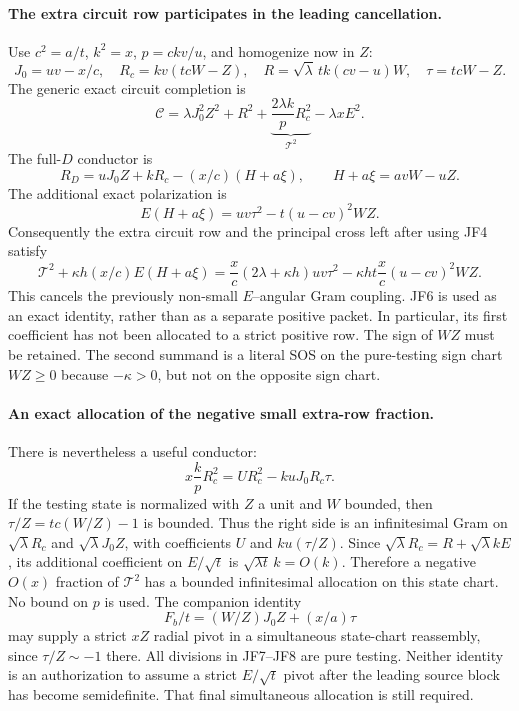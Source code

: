\paragraph{The extra circuit row participates in the leading cancellation.}
Use $c^2=a/t$, $k^2=x$, $p=ckv/u$, and homogenize now in $Z$:
\[
 J_0=uv-x/c,\quad R_c=kv(tcW-Z),\quad
 R=\sqrt\lambda\,tk(cv-u)W,
 \quad \tau=tcW-Z.
\]
The generic exact circuit completion is
\[
 \mathscr C=\lambda J_0^2Z^2+R^2+
      \underbrace{\frac{2\lambda k}{p}R_c^2}_{\mathcal T^2}
      -\lambda xE^2.
\]
The full-$D$ conductor is
\[
 R_D=uJ_0Z+kR_c-(x/c)(H+a\xi),\qquad
 H+a\xi=avW-uZ.                                  \tag{JF4}
\]
The additional exact polarization is
\[
 E(H+a\xi)=uv\tau^2-t(u-cv)^2WZ.                  \tag{JF5}
\]
Consequently the extra circuit row and the principal cross left after
using JF4 satisfy
\[
 \mathcal T^2+\kappa h(x/c)E(H+a\xi)
 =\frac{x}{c}(2\lambda+\kappa h)uv\tau^2
      -\kappa ht\frac{x}{c}(u-cv)^2WZ.             \tag{JF6}
\]
This cancels the previously non-small $E$--angular Gram coupling.
JF6 is used as an exact identity, rather than as a separate positive
packet. In particular, its first coefficient has not been allocated
to a strict positive row. The sign of $WZ$ must be retained. The second summand is a
literal SOS on the pure-testing sign chart $WZ\ge0$ because
$-\kappa>0$, but not on the opposite sign chart.

\paragraph{An exact allocation of the negative small extra-row fraction.}
There is nevertheless a useful conductor:
\[
 x\frac{k}{p}R_c^2
          =U R_c^2-kuJ_0R_c\tau.                   \tag{JF7}
\]
If the testing state is normalized with $Z$ a unit and $W$ bounded,
then $\tau/Z=tc(W/Z)-1$ is bounded. Thus the right side is an
infinitesimal Gram on $\sqrt\lambda R_c$ and
$\sqrt\lambda J_0Z$, with coefficients $U$ and
$ku(\tau/Z)$. Since
$\sqrt\lambda R_c=R+\sqrt\lambda kE$, its additional coefficient
on $E/\sqrt t$ is $\sqrt{\lambda t}\,k=O(k)$.
Therefore a negative $O(x)$ fraction of $\mathcal T^2$ has a bounded
infinitesimal allocation on this state chart. No bound on $p$ is used.
The companion identity
\[
 F_b/t=(W/Z)J_0Z+(x/a)\tau                          \tag{JF8}
\]
may supply a strict $xZ$ radial pivot in a simultaneous state-chart
reassembly, since $\tau/Z\sim-1$ there. All divisions in JF7--JF8
are pure testing. Neither identity is an authorization to assume a
strict $E/\sqrt t$ pivot after the leading source block has become
semidefinite. That final simultaneous allocation is still required.

